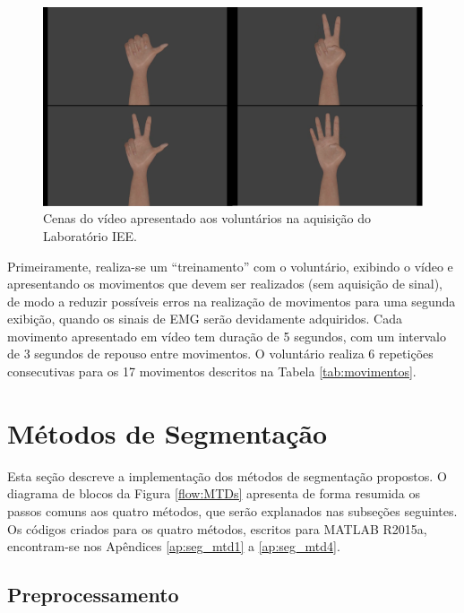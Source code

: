 \begin{figure}[htb]
	\caption{\label{fig:video}Cenas do vídeo apresentado aos voluntários na aquisição do Laboratório IEE.}
	\begin{center}
	    \includegraphics[width=0.75\linewidth]{./img/scenes.png}
	\end{center}
\end{figure}

Primeiramente, realiza-se um ``treinamento'' com o voluntário, exibindo o vídeo e apresentando os movimentos que devem ser realizados (sem aquisição de sinal), de modo a reduzir possíveis erros na realização de movimentos para uma segunda exibição, quando os sinais de EMG serão devidamente adquiridos. Cada movimento apresentado em vídeo tem duração de 5 segundos, com um intervalo de 3 segundos de repouso entre movimentos. O voluntário realiza 6 repetições consecutivas para os 17 movimentos descritos na Tabela \ref{tab:movimentos}.



		\section{Métodos de Segmentação}
Esta seção descreve a implementação dos métodos de segmentação propostos. O diagrama de blocos da Figura \ref{flow:MTDs} apresenta de forma resumida os passos comuns aos quatro métodos, que serão explanados nas subseções seguintes. Os códigos criados para os quatro métodos, escritos para MATLAB R2015a, encontram-se nos Apêndices \ref{ap:seg_mtd1} a \ref{ap:seg_mtd4}.



			\subsection {Preprocessamento}

